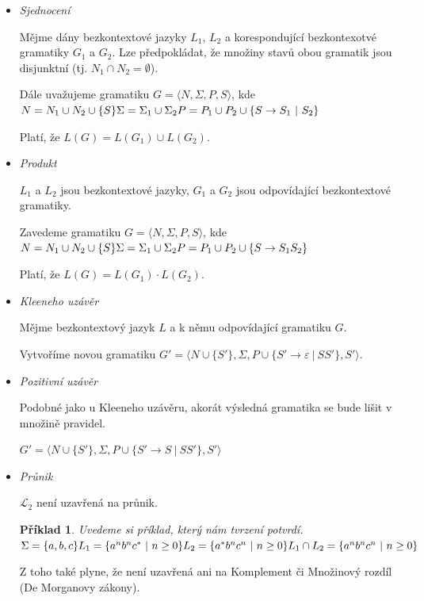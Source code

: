 \documentclass[10pt,a4paper]{article}
\theoremstyle{note}
\newtheorem{priklad}{Příklad}
\begin{document}
\begin{itemize}
\item
\textit{Sjednocení}

Mějme dány bezkontextové jazyky $L_1$, $L_2$ a korespondující bezkontexotvé gramatiky $G_1$ a $G_2$. Lze předpokládat, že množiny stavů obou gramatik jsou disjunktní (tj. $N_1 \cap N_2 = \emptyset$).

Dále uvažujeme gramatiku $G = \langle N,\Sigma,P,S \rangle$, kde \\
$N=N_1 \cup N_2 \cup \lbrace S \rbrace \\
\Sigma = \Sigma_1 \cup \Sigma_2 \\
P = P_1 \cup P_2 \cup \lbrace S \rightarrow S_1\ |\ S_2 \rbrace$

Platí, že $L(G)=L(G_1) \cup L(G_2)$.

\item
\textit{Produkt}

$L_1$ a $L_2$ jsou bezkontextové jazyky, $G_1$ a $G_2$ jsou odpovídající bezkontextové gramatiky.

Zavedeme gramatiku $G = \langle N,\Sigma,P,S \rangle$, kde \\
$N=N_1 \cup N_2 \cup \lbrace S \rbrace \\
\Sigma = \Sigma_1 \cup \Sigma_2 \\
P = P_1 \cup P_2 \cup \lbrace S \rightarrow S_1S_2 \rbrace$

Platí, že $L(G) = L(G_1) \cdot L(G_2)$.

\item
\textit{Kleeneho uzávěr}

Mějme bezkontextový jazyk $L$ a k němu odpovídající gramatiku $G$.

Vytvoříme novou gramatiku $G' = \langle N \cup \lbrace S' \rbrace,\Sigma,P \cup \lbrace S' \rightarrow \varepsilon\ |\ SS'\rbrace,S' \rangle$.

\item
\textit{Pozitivní uzávěr}

Podobné jako u Kleeneho uzávěru, akorát výsledná gramatika se bude lišit v množině pravidel.

$G' = \langle N \cup \lbrace S' \rbrace,\Sigma,P \cup \lbrace S' \rightarrow S\ |\ SS'\rbrace,S' \rangle$

\item
\textit{Průnik}

$\mathcal{L}_2$ není uzavřená na průnik.

\begin{priklad}
Uvedeme si příklad, který nám tvrzení potvrdí.\\
$\Sigma = \lbrace a,b,c \rbrace \\
L_1 = \lbrace a^nb^nc^*\ |\ n \ge 0 \rbrace \\
L_2 = \lbrace a^*b^nc^n\ |\ n \ge 0 \rbrace \\
\\
L_1 \cap L_2 = \lbrace a^nb^nc^n\ |\ n \ge 0 \rbrace$
\end{priklad}
Z toho také plyne, že není uzavřená ani na Komplement či Množinový rozdíl (De Morganovy zákony).
\end{itemize}
\end{document}
